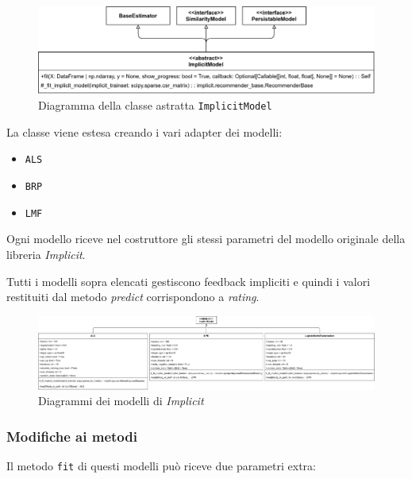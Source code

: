 \begin{figure}[H]
    \centering
    \includegraphics[scale=0.15]{figures/UML/models/implicit_model.png}
    \caption{Diagramma della classe astratta \texttt{ImplicitModel}}
\end{figure}

La classe viene estesa creando i vari adapter dei modelli:

\begin{itemize}
    \item \texttt{ALS}
    \item \texttt{BRP}
    \item \texttt{LMF}
\end{itemize}

Ogni modello riceve nel costruttore gli stessi parametri del modello originale della libreria \textit{Implicit}.

Tutti i modelli sopra elencati gestiscono feedback impliciti e quindi i valori restituiti dal metodo \textit{predict} corrispondono a \textit{rating}.

\begin{figure}[H]
    \centering
    \includegraphics[angle=90, scale=0.1]{figures/UML/models/implicit_models.png}
    \caption{Diagrammi dei modelli di \textit{Implicit}}
\end{figure}

\subsubsection{Modifiche ai metodi}

Il metodo \texttt{fit} di questi modelli può riceve due parametri extra:

